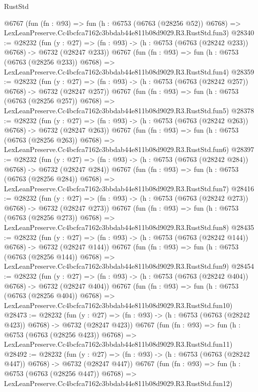 \begin{lexlean}{RustStd}
\begin{coremodule}
    @6767
    (fun (fn : @93) =>
    fun (h : @6753 (@6763 (@28256 @52)) @6768) =>
    LexLeanPreserve.Cc4bcfca7162c3bbdab44e811b08d9029.R3.RustStd.fun3)
@28340 := @28232
    (fun (y : @27) => (fn : @93) -> (h : @6753 (@6763 (@28242 @233)) @6768) -> @6732 (@28247 @233))
    @6767
    (fun (fn : @93) =>
    fun (h : @6753 (@6763 (@28256 @233)) @6768) =>
    LexLeanPreserve.Cc4bcfca7162c3bbdab44e811b08d9029.R3.RustStd.fun4)
@28359 := @28232
    (fun (y : @27) => (fn : @93) -> (h : @6753 (@6763 (@28242 @257)) @6768) -> @6732 (@28247 @257))
    @6767
    (fun (fn : @93) =>
    fun (h : @6753 (@6763 (@28256 @257)) @6768) =>
    LexLeanPreserve.Cc4bcfca7162c3bbdab44e811b08d9029.R3.RustStd.fun5)
@28378 := @28232
    (fun (y : @27) => (fn : @93) -> (h : @6753 (@6763 (@28242 @263)) @6768) -> @6732 (@28247 @263))
    @6767
    (fun (fn : @93) =>
    fun (h : @6753 (@6763 (@28256 @263)) @6768) =>
    LexLeanPreserve.Cc4bcfca7162c3bbdab44e811b08d9029.R3.RustStd.fun6)
@28397 := @28232
    (fun (y : @27) => (fn : @93) -> (h : @6753 (@6763 (@28242 @284)) @6768) -> @6732 (@28247 @284))
    @6767
    (fun (fn : @93) =>
    fun (h : @6753 (@6763 (@28256 @284)) @6768) =>
    LexLeanPreserve.Cc4bcfca7162c3bbdab44e811b08d9029.R3.RustStd.fun7)
@28416 := @28232
    (fun (y : @27) => (fn : @93) -> (h : @6753 (@6763 (@28242 @273)) @6768) -> @6732 (@28247 @273))
    @6767
    (fun (fn : @93) =>
    fun (h : @6753 (@6763 (@28256 @273)) @6768) =>
    LexLeanPreserve.Cc4bcfca7162c3bbdab44e811b08d9029.R3.RustStd.fun8)
@28435 := @28232
    (fun (y : @27) => (fn : @93) -> (h : @6753 (@6763 (@28242 @144)) @6768) -> @6732 (@28247 @144))
    @6767
    (fun (fn : @93) =>
    fun (h : @6753 (@6763 (@28256 @144)) @6768) =>
    LexLeanPreserve.Cc4bcfca7162c3bbdab44e811b08d9029.R3.RustStd.fun9)
@28454 := @28232
    (fun (y : @27) => (fn : @93) -> (h : @6753 (@6763 (@28242 @404)) @6768) -> @6732 (@28247 @404))
    @6767
    (fun (fn : @93) =>
    fun (h : @6753 (@6763 (@28256 @404)) @6768) =>
    LexLeanPreserve.Cc4bcfca7162c3bbdab44e811b08d9029.R3.RustStd.fun10)
@28473 := @28232
    (fun (y : @27) => (fn : @93) -> (h : @6753 (@6763 (@28242 @423)) @6768) -> @6732 (@28247 @423))
    @6767
    (fun (fn : @93) =>
    fun (h : @6753 (@6763 (@28256 @423)) @6768) =>
    LexLeanPreserve.Cc4bcfca7162c3bbdab44e811b08d9029.R3.RustStd.fun11)
@28492 := @28232
    (fun (y : @27) => (fn : @93) -> (h : @6753 (@6763 (@28242 @447)) @6768) -> @6732 (@28247 @447))
    @6767
    (fun (fn : @93) =>
    fun (h : @6753 (@6763 (@28256 @447)) @6768) =>
    LexLeanPreserve.Cc4bcfca7162c3bbdab44e811b08d9029.R3.RustStd.fun12)

\end{coremodule}
\end{lexlean}
